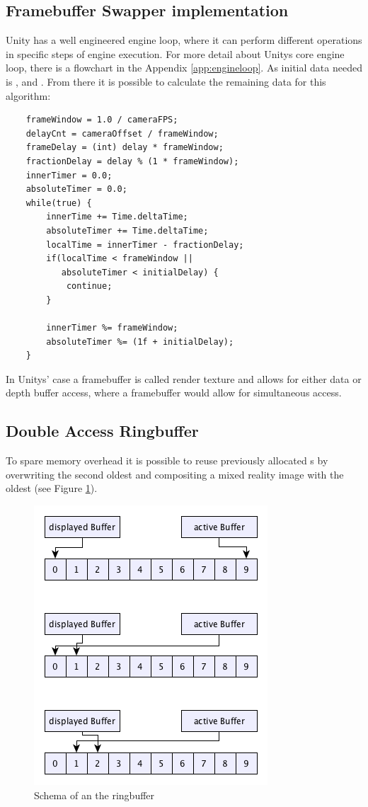 \subsection{Framebuffer Swapper implementation}

Unity has a well engineered engine loop, where it can perform different 
operations in specific steps of engine execution. For more detail about Unitys 
core engine loop, there is a flowchart in the Appendix \ref{app:engineloop}. As 
initial data needed is ,  and 
. From there it is possible to calculate the remaining 
data for this algorithm:

\begin{lstlisting}
	frameWindow = 1.0 / cameraFPS;
	delayCnt = cameraOffset / frameWindow;
	frameDelay = (int) delay * frameWindow;
	fractionDelay = delay % (1 * frameWindow);
	innerTimer = 0.0;
	absoluteTimer = 0.0;
	while(true) {
		innerTime += Time.deltaTime;
		absoluteTimer += Time.deltaTime;
		localTime = innerTimer - fractionDelay;
		if(localTime < frameWindow ||
		   absoluteTimer < initialDelay) {
			continue;
		}
		
		innerTimer %= frameWindow;
		absoluteTimer %= (1f + initialDelay);
	}
\end{lstlisting}


In Unitys' case a framebuffer is called \gls{render texture} and allows for 
either data or depth buffer access, where a framebuffer would allow for 
simultaneous access.

\subsection{Double Access Ringbuffer}

To spare memory overhead it is possible to reuse previously allocated 
s by overwriting the second oldest  and 
compositing a mixed reality image with the oldest (see 
Figure \ref{fig:offsets:ringbuffer}).

\begin{figure}[htb]
	\centering
	\includegraphics[width=.5\textwidth]{gfx/ringbuffer_schematics.png}
	\caption{Schema of an the ringbuffer}
	\label{fig:offsets:ringbuffer}
\end{figure}

